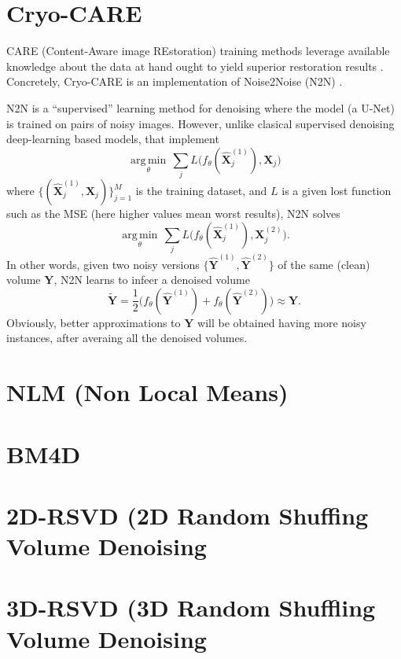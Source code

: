 \documentclass{article}
\begin{document}


\section{Cryo-CARE \cite{buchholz2019cryo}}
CARE (Content-Aware image REstoration) training methods leverage
available knowledge about the data at hand ought to yield superior
restoration results \cite{weigert2018content}. Concretely, Cryo-CARE
is an implementation of Noise2Noise (N2N) \cite{lehtinen2018noise2noise}.

N2N is a ``supervised'' learning method for denoising where the model
(a U-Net) is trained on pairs of noisy images. However, unlike
clasical supervised denoising deep-learning based models, that
implement
\begin{equation}
  \underset{\theta}{\operatorname{arg\,min}} \, \sum_j L \big(f_\theta(\hat{\mathbf X}_j^{(1)}), {\mathbf X}_j\big)
\end{equation}
where $\{(\hat{\mathbf X}_j^{(1)}, {\mathbf X}_j)\}_{j=1}^M$ is the training
dataset, and $L$ is a given lost function such as the MSE (here higher
values mean worst results), N2N solves
\begin{equation}
  \underset{\theta}{\operatorname{arg\,min}} \, \sum_j L \big(f_\theta(\hat{\mathbf X}_j^{(1)}), {\mathbf X}_j^{(2)}\big).
\end{equation}
In other words, given two noisy versions
$\{\hat{\mathbf Y}^{(1)}, \hat{\mathbf Y}^{(2)}\}$ of the same (clean)
volume ${\mathbf Y}$, N2N learns to infeer a denoised volume
\begin{equation}
  \tilde{\mathbf Y}=\frac{1}{2}\big(f_\theta(\hat{\mathbf Y}^{(1)})+f_\theta(\hat{\mathbf Y}^{(2)})\big)\approx{\mathbf Y}.
\end{equation}
Obviously, better approximations to ${\mathbf Y}$ will be obtained
having more noisy instances, after averaing all the denoised volumes.

\section{NLM (Non Local Means)} 

\section{BM4D}

\section{2D-RSVD (2D Random Shuffing Volume Denoising}

\section{3D-RSVD (3D Random Shuffling Volume Denoising}


\section{}



\end{document}
